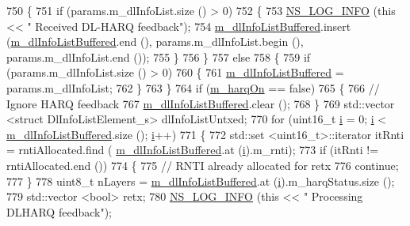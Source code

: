 \begin{DoxyCode}
750     \{
751       \textcolor{keywordflow}{if} (params.m\_dlInfoList.size () > 0)
752         \{
753           \hyperlink{group__logging_gafbd73ee2cf9f26b319f49086d8e860fb}{NS\_LOG\_INFO} (\textcolor{keyword}{this} << \textcolor{stringliteral}{" Received DL-HARQ feedback"});
754           \hyperlink{classns3_1_1TdMtFfMacScheduler_a4237ad4223d377a1c9963a904acbe4ad}{m\_dlInfoListBuffered}.insert (\hyperlink{classns3_1_1TdMtFfMacScheduler_a4237ad4223d377a1c9963a904acbe4ad}{m\_dlInfoListBuffered}.end (),
       params.m\_dlInfoList.begin (), params.m\_dlInfoList.end ());
755         \}
756     \}
757   \textcolor{keywordflow}{else}
758     \{
759       \textcolor{keywordflow}{if} (params.m\_dlInfoList.size () > 0)
760         \{
761           \hyperlink{classns3_1_1TdMtFfMacScheduler_a4237ad4223d377a1c9963a904acbe4ad}{m\_dlInfoListBuffered} = params.m\_dlInfoList;
762         \}
763     \}
764   \textcolor{keywordflow}{if} (\hyperlink{classns3_1_1TdMtFfMacScheduler_af0253034544a704cb4d8583fae9377a3}{m\_harqOn} == \textcolor{keyword}{false})
765     \{
766       \textcolor{comment}{// Ignore HARQ feedback}
767       \hyperlink{classns3_1_1TdMtFfMacScheduler_a4237ad4223d377a1c9963a904acbe4ad}{m\_dlInfoListBuffered}.clear ();
768     \}
769   std::vector <struct DlInfoListElement\_s> dlInfoListUntxed;
770   \textcolor{keywordflow}{for} (uint16\_t \hyperlink{bernuolliDistribution_8m_a6f6ccfcf58b31cb6412107d9d5281426}{i} = 0; \hyperlink{bernuolliDistribution_8m_a6f6ccfcf58b31cb6412107d9d5281426}{i} < \hyperlink{classns3_1_1TdMtFfMacScheduler_a4237ad4223d377a1c9963a904acbe4ad}{m\_dlInfoListBuffered}.size (); \hyperlink{bernuolliDistribution_8m_a6f6ccfcf58b31cb6412107d9d5281426}{i}++)
771     \{
772       std::set <uint16\_t>::iterator itRnti = rntiAllocated.find (
      \hyperlink{classns3_1_1TdMtFfMacScheduler_a4237ad4223d377a1c9963a904acbe4ad}{m\_dlInfoListBuffered}.at (\hyperlink{bernuolliDistribution_8m_a6f6ccfcf58b31cb6412107d9d5281426}{i}).m\_rnti);
773       \textcolor{keywordflow}{if} (itRnti != rntiAllocated.end ())
774         \{
775           \textcolor{comment}{// RNTI already allocated for retx}
776           \textcolor{keywordflow}{continue};
777         \}
778       uint8\_t nLayers = \hyperlink{classns3_1_1TdMtFfMacScheduler_a4237ad4223d377a1c9963a904acbe4ad}{m\_dlInfoListBuffered}.at (\hyperlink{bernuolliDistribution_8m_a6f6ccfcf58b31cb6412107d9d5281426}{i}).m\_harqStatus.size ();
779       std::vector <bool> retx;
780       \hyperlink{group__logging_gafbd73ee2cf9f26b319f49086d8e860fb}{NS\_LOG\_INFO} (\textcolor{keyword}{this} << \textcolor{stringliteral}{" Processing DLHARQ feedback"});

\end{DoxyCode}
